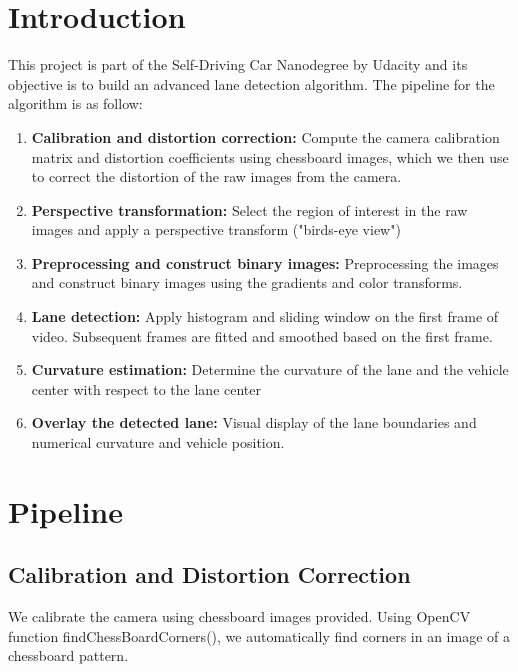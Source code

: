 \documentclass[12pt,twoside]{article}
\begin{document}



\section{Introduction}
This project is part of the Self-Driving Car Nanodegree by Udacity and its objective is to build an advanced lane detection algorithm. The pipeline for the algorithm is as follow:
\begin{enumerate}
	\item \textbf{Calibration and distortion correction: } Compute the camera calibration matrix and distortion coefficients using chessboard images, which we then use to correct the distortion of the raw images from the camera.
	\item \textbf{Perspective transformation:}  Select the region of interest in the raw images and apply a perspective transform ("birds-eye view")
	\item \textbf{Preprocessing and construct binary images:} Preprocessing the images and construct binary images using the gradients and color transforms.
	\item \textbf{Lane detection:} Apply histogram and sliding window on the first frame of video. Subsequent frames are fitted and smoothed based on the first frame.
	\item \textbf{Curvature estimation:} Determine the curvature of the lane and the vehicle center with respect to the lane center
	\item \textbf{Overlay the detected lane:} Visual display of the lane boundaries and numerical curvature and vehicle position.
\end{enumerate}

\section{Pipeline}
\subsection{Calibration and Distortion Correction}
We calibrate the camera using chessboard images provided. Using OpenCV function findChessBoardCorners(), we automatically find corners in an image of a chessboard pattern. 
\end{document}
